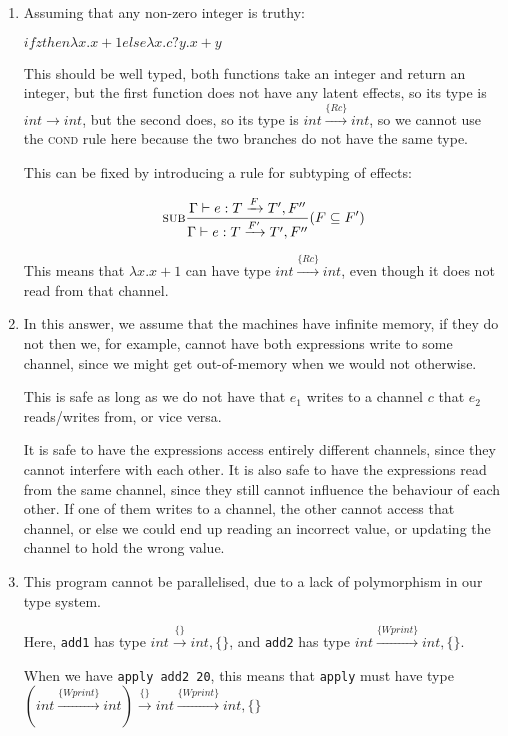 \begin{enumerate}[label=(\alph*)]
\begin{enumerate}[label=(\roman*)]
    \end{enumerate}
      \item
        Assuming that any non-zero integer is truthy:

        $if z then \lambda x. x+1 else \lambda x. c?y. x + y$

        This should be well typed, both functions take an integer and return an integer, but the first function does not have any latent effects, so its type is $int \rightarrow int$, but the second does, so its type is $int \xrightarrow{\{Rc\}} int$, so we cannot use the \textsc{cond} rule here because the two branches do not have the same type.

        This can be fixed by introducing a rule for subtyping of effects:

        \[
          \textsc{sub}\frac{\Gamma \vdash e : T \xrightarrow{F} T', F''}{\Gamma \vdash e : T \xrightarrow{F'} T', F''}(F \subseteq F')
        \] 

        This means that $\lambda x. x+1$ can have type $int \xrightarrow{\{Rc\}} int$, even though it does not read from that channel.

      \item

        In this answer, we assume that the machines have infinite memory, if they do not then we, for example, cannot have both expressions write to some channel, since we might get out-of-memory when we would not otherwise.

        This is safe as long as we do not have that $e_1$ writes to a channel $c$ that $e_2$ reads/writes from, or vice versa.

        It is safe to have the expressions access entirely different channels, since they cannot interfere with each other. It is also safe to have the expressions read from the same channel, since they still cannot influence the behaviour of each other. If one of them writes to a channel, the other cannot access that channel, or else we could end up reading an incorrect value, or updating the channel to hold the wrong value.

      \item
        This program cannot be parallelised, due to a lack of polymorphism in our type system.


        Here, \texttt{add1} has type $int \xrightarrow{\{\}} int, \{\}$, and \texttt{add2} has type $int \xrightarrow{\{Wprint\}} int, \{\}$.

        When we have \texttt{apply add2 20}, this means that \texttt{apply} must have type $(int \xrightarrow{\{Wprint\}} int) \xrightarrow{\{\}} int \xrightarrow{\{Wprint\}} int, \{\}$


\end{enumerate}
